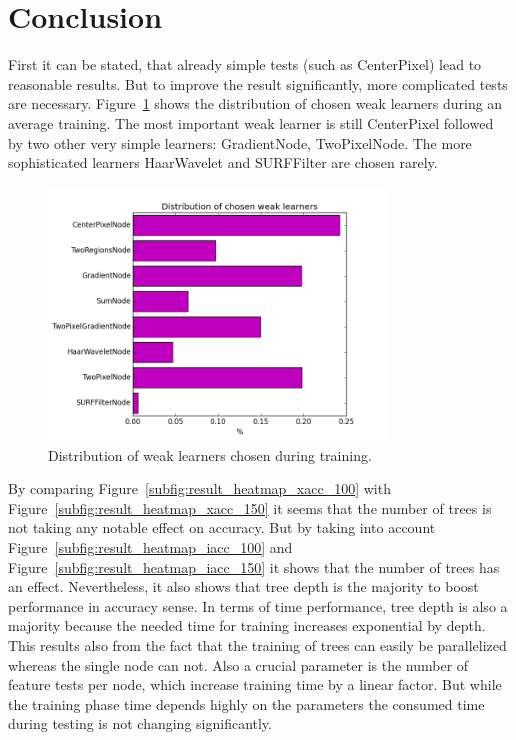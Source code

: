 \section{Conclusion}
\label{sec:conclusion}

First it can be stated, that already simple tests (such as CenterPixel) lead to reasonable results. But to improve the result significantly, more complicated tests are necessary. Figure~\ref{fig:learner_dist} shows the distribution of chosen weak learners during an average training. The most important weak learner is still CenterPixel
followed by two other very simple learners: GradientNode, TwoPixelNode. The more sophisticated learners HaarWavelet and SURFFilter are chosen rarely.

\begin{figure}
	\centering
	\includegraphics[width=0.8\textwidth]{plots/weak_learner_distribution.png}
	\caption{Distribution of weak learners chosen during training.}
	\label{fig:learner_dist}
\end{figure}

By comparing Figure~\ref{subfig:result_heatmap_xacc_100} with Figure~\ref{subfig:result_heatmap_xacc_150} it seems that the number of trees is not taking any notable effect on accuracy. But by taking into account Figure~\ref{subfig:result_heatmap_iacc_100} and Figure~\ref{subfig:result_heatmap_iacc_150} it shows that the number of trees has an effect. Nevertheless, it also shows that tree depth is the majority to boost performance in accuracy sense. In terms of time performance, tree depth is also a majority because the needed time for training increases exponential by depth. This results also from the fact that the training of trees can easily be parallelized whereas the single node can not. Also a crucial parameter is the number of feature tests per node, which increase training time by a linear factor. But while the training phase time depends highly on the parameters the consumed time during testing is not changing significantly.


